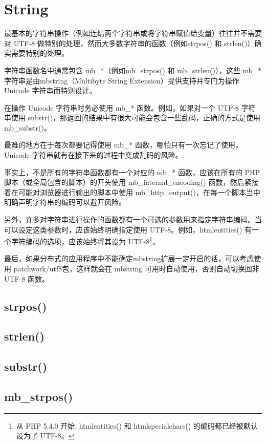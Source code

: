 \section{String}


最基本的字符串操作（例如连结两个字符串或将字符串赋值给变量）往往并不需要对 UTF-8 做特别的处理，然而大多数字符串的函数（例如strpos() 和 strlen()）确实需要特别的处理。

字符串函数名中通常包含 mb\_*（例如mb\_strpos() 和 mb\_strlen()），这些 mb\_* 字符串是由mbstring（Multibyte String Extension）提供支持并专门为操作 Unicode 字符串而特别设计。

在操作 Unicode 字符串时务必使用 mb\_* 函数。例如，如果对一个 UTF-8 字符串使用 substr()，那返回的结果中有很大可能会包含一些乱码，正确的方式是使用 mb\_substr()。

最难的地方在于每次都要记得使用 mb\_* 函数，哪怕只有一次忘记了使用，Unicode 字符串就有在接下来的过程中变成乱码的风险。

事实上，不是所有的字符串函数都有一个对应的 mb\_* 函数，应该在所有的 PHP 脚本（或全局包含的脚本）的开头使用 mb\_internal\_encoding() 函数，然后紧接着在可能对浏览器进行输出的脚本中使用 mb\_http\_output()，在每一个脚本当中明确声明字符串的编码可以避开风险。

另外，许多对字符串进行操作的函数都有一个可选的参数用来指定字符串编码。当可以设定这类参数时，应该始终明确指定使用 UTF-8。例如，htmlentities() 有一个字符编码的选项，应该始终将其设为 UTF-8\footnote{从 PHP 5.4.0 开始, htmlentities() 和 htmlspecialchars() 的编码都已经被默认设为了 UTF-8。}。

最后，如果分布式的应用程序中不能确定mbstring扩展一定开启的话，可以考虑使用 patchwork/utf8包，这样就会在 mbstring 可用时自动使用，否则自动切换回非 UTF-8 函数。

\subsection{strpos()}


\subsection{strlen()}


\subsection{substr()}

\subsection{mb\_strpos()}


